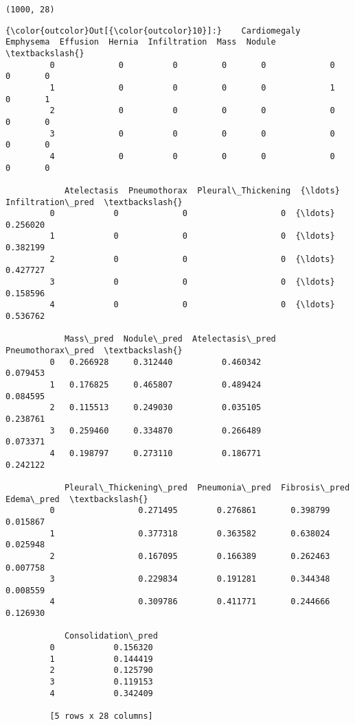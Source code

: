 \documentclass[11pt]{article}
\begin{document}
    \begin{Verbatim}[commandchars=\\\{\}]
(1000, 28)

    \end{Verbatim}

\begin{Verbatim}[commandchars=\\\{\}]
{\color{outcolor}Out[{\color{outcolor}10}]:}    Cardiomegaly  Emphysema  Effusion  Hernia  Infiltration  Mass  Nodule  \textbackslash{}
         0             0          0         0       0             0     0       0   
         1             0          0         0       0             1     0       1   
         2             0          0         0       0             0     0       0   
         3             0          0         0       0             0     0       0   
         4             0          0         0       0             0     0       0   
         
            Atelectasis  Pneumothorax  Pleural\_Thickening  {\ldots}  Infiltration\_pred  \textbackslash{}
         0            0             0                   0  {\ldots}           0.256020   
         1            0             0                   0  {\ldots}           0.382199   
         2            0             0                   0  {\ldots}           0.427727   
         3            0             0                   0  {\ldots}           0.158596   
         4            0             0                   0  {\ldots}           0.536762   
         
            Mass\_pred  Nodule\_pred  Atelectasis\_pred  Pneumothorax\_pred  \textbackslash{}
         0   0.266928     0.312440          0.460342           0.079453   
         1   0.176825     0.465807          0.489424           0.084595   
         2   0.115513     0.249030          0.035105           0.238761   
         3   0.259460     0.334870          0.266489           0.073371   
         4   0.198797     0.273110          0.186771           0.242122   
         
            Pleural\_Thickening\_pred  Pneumonia\_pred  Fibrosis\_pred  Edema\_pred  \textbackslash{}
         0                 0.271495        0.276861       0.398799    0.015867   
         1                 0.377318        0.363582       0.638024    0.025948   
         2                 0.167095        0.166389       0.262463    0.007758   
         3                 0.229834        0.191281       0.344348    0.008559   
         4                 0.309786        0.411771       0.244666    0.126930   
         
            Consolidation\_pred  
         0            0.156320  
         1            0.144419  
         2            0.125790  
         3            0.119153  
         4            0.342409  
         
         [5 rows x 28 columns]
\end{Verbatim}
            
\end{document}
